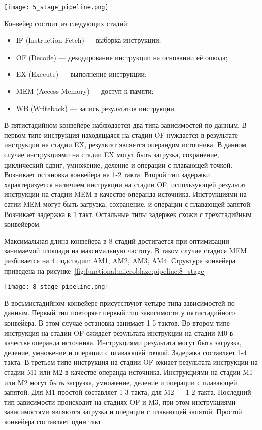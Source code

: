 \begin{center}
  \centering
  \texttt{[image: 5\_stage\_pipeline.png]}
  \label{fig:functional:microblaze:pipeline:5_stage}
\end{center}

Конвейер состоит из следующих стадий:
\begin{itemize}
  \item IF (Instruction Fetch) --- выборка инструкции;
  \item OF (Decode) --- декодирование инструкции на основании её опкода;
  \item EX (Execute) --- выполнение инструкции;
  \item MEM (Access Memory) --- доступ к памяти;
  \item WB (Writeback) --- запись результатов инструкции.
\end{itemize}


В пятистадийном конвейере наблюдается два типа зависимостей по данным. В первом типе
инструкция находящаяся на стадии OF нуждается в результате инструкции на стадии EX,
результат является операндом источника. В данном случае инструкциями на стадии EX
могут быть загрузка, сохранение, циклический сдвиг, умножение, деление и операции
с плавающей точкой. Возникает остановка конвейера на 1-2 такта.
Второй тип задержки характеризуется наличием инструкции на стадии OF, использующей
результат инструкции на стадии MEM в качестве операнда источника. Инструкциями на сатии
MEM могут быть загрузка, сохранение, и операции с плавающей запятой. Возникает задержка
в 1 такт. Остальные типы задержек схожи с трёхстадийным конвейером.

Максимальная длина конвейера в 8 стадий достигается при оптимизации занимаемой площади
на максимальную частоту. В таком случае стадися MEM разбивается на 4 подстадии: AM1,
AM2, AM3, AM4.
Структура конвейера приведена на рисунке~\ref{fig:functional:microblaze:pipeline:8_stage}

\begin{center}
  \centering
  \texttt{[image: 8\_stage\_pipeline.png]}
  \label{fig:functional:microblaze:pipeline:8_stage}
\end{center}

В восьмистадийном конвейере присутствуют четыре типа зависимостей по данным.
Первый тип повторяет первый тип зависимости у пятистадийного конвейера. В
этом случае остановка занимает 1-5 тактов. Во втором типе инструкция на стадии
OF ожидает результата инструкции на стадии M0 в качестве операнда источника.
Инструкциями результата могут быть загрузка, деление, умножение и операции с
плавающей точкой. Задержка составляет 1-4 такта. В третьем типе инструкция
на стадии OF ожиает результата инструкции на стадии M1 или M2 в качестве
операнда источника. Инструкциями на стадии M1 или M2 могут быть загрузка,
умножение, деление и операции с плавающей запятой. Для M1 простой составляет
1-3 такта, для M2 --- 1-2 такта. Последний тип зависимости происходит на стадиях
OF и M3, при этом инструкциями-зависимостями являются загрузка и операции с
плавающей запятой. Простой конвейера составляет один такт.

